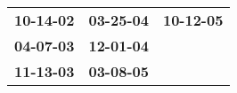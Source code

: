 \begin{supertabular}{p{0.33\columnwidth}p{0.33\columnwidth}p{0.33\columnwidth}}
 \textbf{10-14-02\textsuperscript{}} &  \textbf{03-25-04\textsuperscript{}} &  \textbf{10-12-05\textsuperscript{}} \\
 \textbf{04-07-03\textsuperscript{}} &  \textbf{12-01-04\textsuperscript{}} &                                      \\
 \textbf{11-13-03\textsuperscript{}} &  \textbf{03-08-05\textsuperscript{}} &                                      \\
\end{supertabular}
